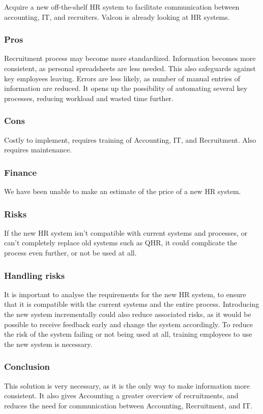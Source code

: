 Acquire a new off-the-shelf HR system to facilitate communication between accounting, IT, and recruiters.
Valcon is already looking at HR systems.

\subsubsection{Pros} Recruitment process may become more standardized.
Information becomes more consistent, as personal spreadsheets are less needed. 
This also safeguards against key employees leaving.
Errors are less likely, as number of manual entries of information are reduced.
It opens up the possibility of automating several key processes, reducing workload and wasted time further.

\subsubsection{Cons} Costly to implement, requires training of Accounting, IT, and Recruitment.
Also requires maintenance.

\subsubsection{Finance}
We have been unable to make an estimate of the price of a new HR system.

\subsubsection{Risks}
If the new HR system isn't compatible with current systems and processes, or can't completely replace old systems such as QHR, it could complicate the process even further, or not be used at all.

\subsubsection{Handling risks}
It is important to analyse the requirements for the new HR system, to ensure that it is compatible with the current systems and the entire process. 
Introducing the new system incrementally could also reduce associated risks, as it would be possible to receive feedback early and change the system accordingly. 
To reduce the risk of the system failing or not being used at all, training employees to use the new system is necessary.

\subsubsection{Conclusion} 
This solution is very necessary, as it is the only way to make information more consistent.
It also gives Accounting a greater overview of recruitments, and reduces the need for communication between Accounting, Recruitment, and IT.

